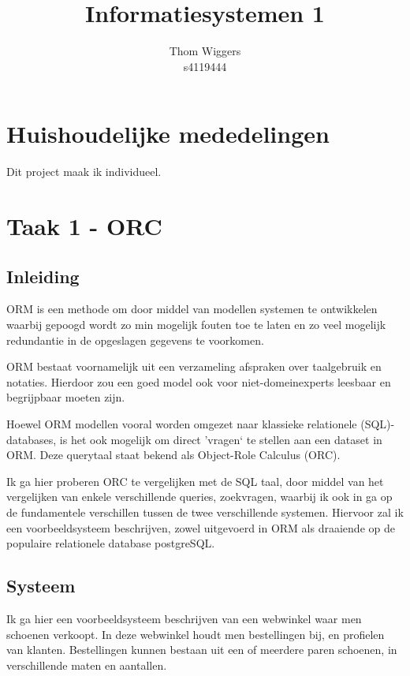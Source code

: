 \documentclass{article}
\author{Thom Wiggers\\ s4119444}
\title{Informatiesystemen 1}
\begin{document}
\maketitle
\tableofcontents
\section{Huishoudelijke mededelingen}
Dit project maak ik individueel. 

\section{Taak 1 - ORC}
\subsection{Inleiding}
\label{sub:1-orm-inleiding}
ORM is een methode om door middel van modellen systemen te ontwikkelen waarbij
gepoogd wordt zo min mogelijk fouten toe te laten en zo veel mogelijk
redundantie in de opgeslagen gegevens te voorkomen. 

ORM bestaat voornamelijk uit een verzameling afspraken over taalgebruik en
notaties. Hierdoor zou een goed model ook voor niet-domeinexperts leesbaar
en begrijpbaar moeten zijn. 

Hoewel ORM modellen vooral worden omgezet naar klassieke relationele
(SQL)-databases, is het ook mogelijk om direct 'vragen` te stellen aan
een dataset in ORM. Deze querytaal staat bekend als Object-Role Calculus 
(ORC).

Ik ga hier proberen ORC te vergelijken met de SQL taal, door middel van het
vergelijken van enkele verschillende queries, zoekvragen, waarbij ik ook 
in ga op de fundamentele verschillen tussen de twee verschillende systemen.
Hiervoor zal ik een voorbeeldsysteem beschrijven, zowel uitgevoerd in ORM 
als draaiende op de populaire relationele database postgreSQL.

\subsection{Systeem}
Ik ga hier een voorbeeldsysteem beschrijven van een webwinkel waar men 
schoenen verkoopt. In deze webwinkel houdt men bestellingen bij, en 
profielen van klanten. Bestellingen kunnen bestaan uit een of meerdere
paren schoenen, in verschillende maten en aantallen.
\end{document}
